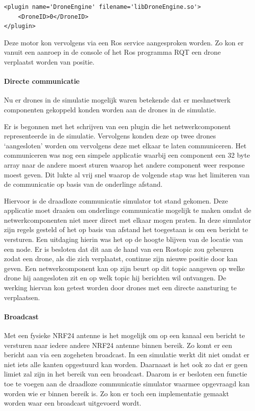 \documentclass[a4paper, 11pt, oneside]{report}
\begin{document}
\begin{lstlisting}
<plugin name='DroneEngine' filename='libDroneEngine.so'>
	<DroneID>0</DroneID>
</plugin>
\end{lstlisting}

Deze motor kon vervolgens via een Ros service aangesproken worden.
Zo kon er vanuit een aanroep in de console of het Ros programma RQT een drone verplaatst worden van positie. 

\paragraph{Directe communicatie}
Nu er drones in de simulatie mogelijk waren betekende dat er meshnetwerk componenten gekoppeld konden worden aan de drones in de simulatie.

Er is begonnen met het schrijven van een plugin die het netwerkcomponent representeerde in de simulatie. 
Vervolgens konden deze op twee drones `aangesloten' worden om vervolgens deze met elkaar te laten communiceren.
Het communiceren was nog een simpele applicatie waarbij een component een 32 byte array naar de andere moest sturen waarop het andere component weer response moest geven.
Dit lukte al vrij snel waarop de volgende stap was het limiteren van de communicatie op basis van de onderlinge afstand.

Hiervoor is de draadloze communicatie simulator tot stand gekomen. 
Deze applicatie moet draaien om onderlinge communicatie mogelijk te maken omdat de netwerkcomponenten niet meer direct met elkaar mogen praten.
In deze simulator zijn regels gesteld of het op basis van afstand het toegestaan is om een bericht te versturen.
Een uitdaging hierin was het op de hoogte blijven van de locatie van een node. 
Er is besloten dat dit aan de hand van een Rostopic zou gebeuren zodat een drone, als die zich verplaatst, continue zijn nieuwe positie door kan geven.
Een netwerkcomponent kan op zijn beurt op dit topic aangeven op welke drone hij aangesloten zit en op welk topic hij berichten wil ontvangen. De werking hiervan kon getest worden door drones met een directe aansturing te verplaatsen.

\paragraph{Broadcast}
Met een fysieke NRF24 antenne is het mogelijk om op een kanaal een bericht te versturen naar iedere andere NRF24 antenne binnen bereik.
Zo komt er een bericht aan via een zogeheten broadcast. 
In een simulatie werkt dit niet omdat er niet iets alle kanten opgestuurd kan worden.
Daarnaast is het ook zo dat er geen limiet zal zijn in het bereik van een broadcast.
Daarom is er besloten een functie toe te voegen aan de draadloze communicatie simulator waarmee opgevraagd kan worden wie er binnen bereik is.
Zo kon er toch een implementatie gemaakt worden waar een broadcast uitgevoerd wordt.
\end{document}
